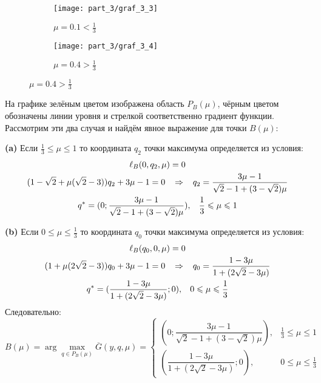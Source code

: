 \begin{figure}[H]
   	\centering
	\begin{subfigure}[b]{0.4 \textwidth}
        \centering
        \texttt{[image: part\_3/graf\_3\_3]}
        \caption{$\mu=0.1 < \frac{1}{3}$}
         \label{fig:y equals x}
     \end{subfigure}
     \hspace{10mm}
     \begin{subfigure}[b]{0.4 \textwidth}
       	\centering
       	\texttt{[image: part\_3/graf\_3\_4]}
       	\caption{$\mu=0.4 > \frac{1}{3}$}
       	\label{fig:three sin x}
     \end{subfigure}
\end{figure}	

На графике зелёным цветом изображена область $P_B(\mu)$, чёрным цветом
обозначены линии уровня и стрелкой соответственно градиент функции.
Рассмотрим эти два случая и найдём явное выражение для точки $B(\mu)$:
	
\textbf{(a)}
Если $\frac{1}{3} \leqslant \mu \leqslant 1$ то координата $q_2$ 
точки максимума определяется из условия: 	
\begin{gather*}
	\ell_B(0,q_2,\mu)=0
	\\
	(1-\sqrt{2}+\mu(\sqrt{2}-3))q_2+3\mu-1=0
	\hspace{3mm} \Rightarrow \hspace{3mm}
	q_2=\frac{3\mu-1}{\sqrt{2}-1+(3-\sqrt{2})\mu}	
	\\
	q^*=(0;\dfrac{3\mu-1}{\sqrt{2}-1+(3-\sqrt{2})\mu}), \hspace{3mm}
	\frac{1}{3} \leqslant \mu \leqslant 1
\end{gather*}

\textbf{(b)}
Если $0 \leqslant \mu \leqslant \frac{1}{3}$ то координата $q_0$ точки 
максимума определяется из условия: 	
\begin{gather*}
	\ell_B(q_0,0,\mu)=0
	\\	
	(1+\mu(2\sqrt{2}-3))q_0
	+3\mu-1=0
	\hspace{3mm} \Rightarrow \hspace{3mm}
	q_0=\frac{1-3\mu}{1+(2\sqrt{2}-3\mu)}	
	\\ 	
	q^*=(\frac{1-3\mu}{1+(2\sqrt{2}-3\mu)}; 0), \hspace{3mm}
	0 \leqslant \mu \leqslant \frac{1}{3}
\end{gather*}
Следовательно:
\begin{equation} 
	\label{eq:B_point}
	B(\mu) = \arg \max \limits_{q\in P_B(\mu)} \overline G(y,q,\mu) = 
	\begin{cases}
		(0;\dfrac{3\mu-1}{\sqrt{2}-1+(3-\sqrt{2})\mu})
		, & \frac{1}{3} \leqslant \mu \leqslant 1
		\\
		(\dfrac{1-3\mu}{1+(2\sqrt{2}-3\mu)};0)
		, & 0 \leqslant \mu \leqslant \frac{1}{3}
	\end{cases}
\end{equation}

